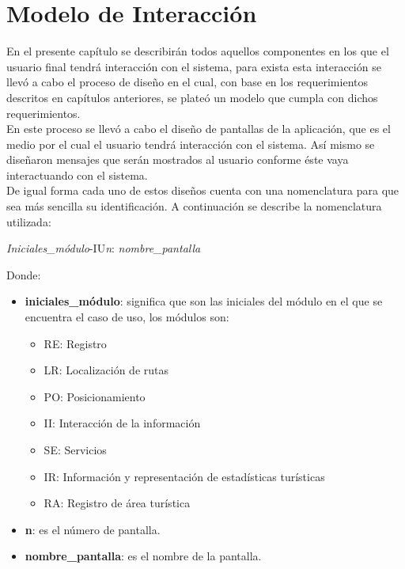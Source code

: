 \chapter{Modelo de Interacción}

En el presente capítulo se describirán todos aquellos componentes en los que el usuario final tendrá interacción con el sistema, para exista esta interacción se llevó a cabo el proceso de diseño en el cual, con base en los requerimientos descritos en capítulos anteriores, se plateó un modelo que cumpla con dichos requerimientos. \\

En este proceso se llevó a cabo el diseño de pantallas de la aplicación, que es el medio por el cual el usuario tendrá interacción con el sistema. Así mismo se diseñaron mensajes que serán mostrados al usuario conforme éste vaya interactuando con el sistema. \\

De igual forma cada uno de estos diseños cuenta con una nomenclatura para que sea más sencilla su identificación. A continuación se describe la nomenclatura utilizada: 

\begin{center}
	\Large{\textit{Iniciales\_módulo}-IU\textit{n}: \textit{nombre\_pantalla}}
\end{center}

Donde: 

\begin{itemize}
	\item \textbf{iniciales\_módulo}: significa que son las iniciales del módulo en el que se encuentra el caso de uso, los módulos son: 
	\begin{itemize}
		\item RE: Registro
		\item LR: Localización de rutas
		\item PO: Posicionamiento
		\item II: Interacción de la información
		\item SE: Servicios
		\item IR: Información y representación de estadísticas turísticas
		\item RA: Registro de área turística
	\end{itemize}
	
	\item \textbf{n}: es el número de pantalla.
	
	\item \textbf{nombre\_pantalla}: es el nombre de la pantalla.
\end{itemize}

